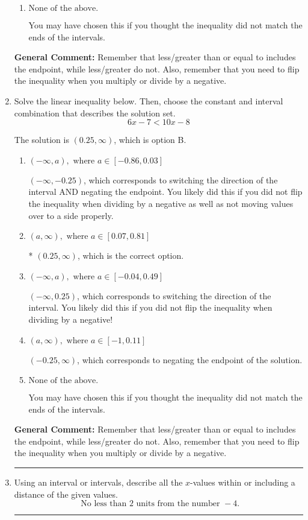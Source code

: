 \documentclass{extbook}[14pt]
\newcommand{\litem}[1]{\item #1

\rule{\textwidth}{0.4pt}}
\begin{document}
\begin{enumerate}
{\begin{enumerate}[label=\Alph*.]
 $(7.5, \infty)$, which corresponds to switching the direction of the interval AND negating the endpoint. You likely did this if you did not flip the inequality when dividing by a negative as well as not moving values over to a side properly.
\item \( \text{None of the above}. \)

You may have chosen this if you thought the inequality did not match the ends of the intervals.
\end{enumerate}

\textbf{General Comment:} Remember that less/greater than or equal to includes the endpoint, while less/greater do not. Also, remember that you need to flip the inequality when you multiply or divide by a negative.
}
\litem{
Solve the linear inequality below. Then, choose the constant and interval combination that describes the solution set.
\[ 6x -7 < 10x -8 \]

The solution is \( (0.25, \infty) \), which is option B.\begin{enumerate}[label=\Alph*.]
\item \( (-\infty, a), \text{ where } a \in [-0.86, 0.03] \)

 $(-\infty, -0.25)$, which corresponds to switching the direction of the interval AND negating the endpoint. You likely did this if you did not flip the inequality when dividing by a negative as well as not moving values over to a side properly.
\item \( (a, \infty), \text{ where } a \in [0.07, 0.81] \)

* $(0.25, \infty)$, which is the correct option.
\item \( (-\infty, a), \text{ where } a \in [-0.04, 0.49] \)

 $(-\infty, 0.25)$, which corresponds to switching the direction of the interval. You likely did this if you did not flip the inequality when dividing by a negative!
\item \( (a, \infty), \text{ where } a \in [-1, 0.11] \)

 $(-0.25, \infty)$, which corresponds to negating the endpoint of the solution.
\item \( \text{None of the above}. \)

You may have chosen this if you thought the inequality did not match the ends of the intervals.
\end{enumerate}

\textbf{General Comment:} Remember that less/greater than or equal to includes the endpoint, while less/greater do not. Also, remember that you need to flip the inequality when you multiply or divide by a negative.
}
\litem{
Using an interval or intervals, describe all the $x$-values within or including a distance of the given values.
\[ \text{ No less than } 2 \text{ units from the number } -4. \]

}
\end{enumerate}
\end{document}
